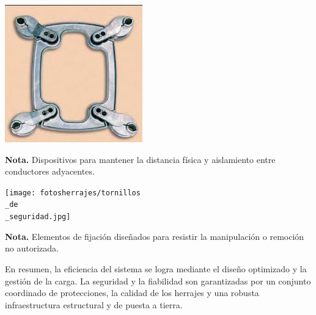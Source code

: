 \vspace{1cm}

\noindent
\begin{minipage}[t]{0.48\textwidth}
    \centering
    \includegraphics[width=\linewidth]{fotosherrajes/separadores para conductores.jpg}
    \footnotesize
    \raggedright
    \textbf{Nota.} Dispositivos para mantener la distancia física y aislamiento entre conductores adyacentes.
\end{minipage}%
\hfill
\begin{minipage}[t]{0.48\textwidth}
    \centering
    \texttt{[image: fotosherrajes/tornillos\\\_de\\\_seguridad.jpg]}
    \footnotesize
    \raggedright
    \textbf{Nota.} Elementos de fijación diseñados para resistir la manipulación o remoción no autorizada.
\end{minipage}

En resumen, la eficiencia del sistema se logra mediante el diseño optimizado y la gestión de la carga. La seguridad y la fiabilidad son garantizadas por un conjunto coordinado de protecciones, la calidad de los herrajes y una robusta infraestructura estructural y de puesta a tierra.
